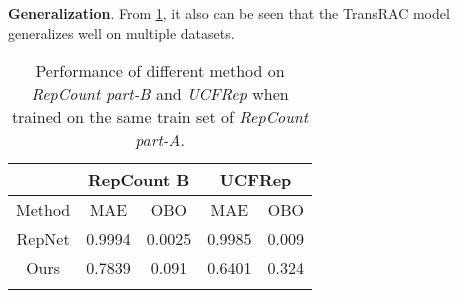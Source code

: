 \documentclass[10pt,twocolumn,letterpaper]{article}
\begin{document}
\noindent \textbf{Generalization}.
From \cref{tab:B+UCF}, it also can be seen that the TransRAC model generalizes well on multiple datasets. 

\begin{table}[ht]
	\centering

	\caption{
		Performance of different method on \emph{RepCount part-A test} when trained on the same train set of \emph{RepCount}.
	}
	\label{tab:RepCount}
\end{table}

\begin{table}[ht]
	\centering
	\begin{tabular}{c|c|c|c|c}
		\hline

		                     & \multicolumn{2}{c|}{RepCount B} & \multicolumn{2}{c}{UCFRep}                                         \\
		\hline
		Method               & MAE                 & OBO              & MAE      & OBO  \\
		\hline
		RepNet \cite{RepNet} & 0.9994                          & 0.0025                     & 0.9985               & 0.009          \\
		Ours                 & 0.7839                          & 0.091                     & 0.6401               & 0.324          \\
		\hline
		\multicolumn{1}{c}{} & \multicolumn{1}{c}{}            & \multicolumn{1}{c}{}       & \multicolumn{1}{c}{} &
	\end{tabular}
	\caption{
		Performance of different method on \emph{RepCount part-B} and \emph{UCFRep} when trained on the same train set of \emph{RepCount part-A}.
	}
	\label{tab:B+UCF}

\end{table}
\end{document}
